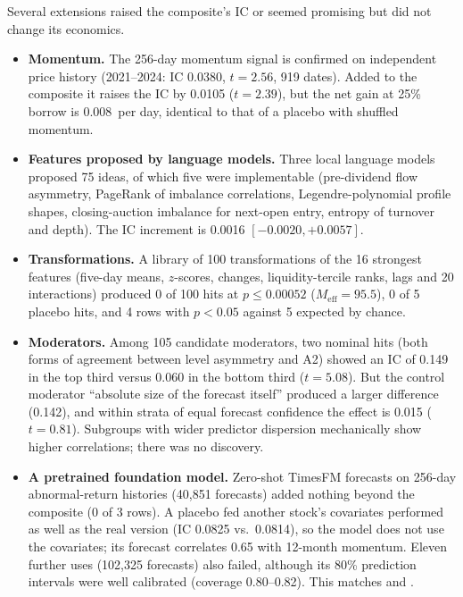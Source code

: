 Several extensions raised the composite's IC or seemed promising but did not change its economics.
\begin{itemize}
\item \textbf{Momentum.} The 256-day momentum signal is confirmed on independent price history (2021--2024: IC 0.0380, $t=2.56$, 919 dates). Added to the composite it raises the IC by 0.0105 ($t=2.39$), but the net gain at 25\% borrow is 0.008\pp\ per day, identical to that of a placebo with shuffled momentum.
\item \textbf{Features proposed by language models.} Three local language models proposed 75 ideas, of which five were implementable (pre-dividend flow asymmetry, PageRank of imbalance correlations, Legendre-polynomial profile shapes, closing-auction imbalance for next-open entry, entropy of turnover and depth). The IC increment is 0.0016 $[-0.0020,+0.0057]$.
\item \textbf{Transformations.} A library of 100 transformations of the 16 strongest features (five-day means, $z$-scores, changes, liquidity-tercile ranks, lags and 20 interactions) produced 0 of 100 hits at $p\le0.00052$ ($M_{\mathrm{eff}}=95.5$), 0 of 5 placebo hits, and 4 rows with $p<0.05$ against 5 expected by chance.
\item \textbf{Moderators.} Among 105 candidate moderators, two nominal hits (both forms of agreement between level asymmetry and A2) showed an IC of 0.149 in the top third versus 0.060 in the bottom third ($t=5.08$). But the control moderator ``absolute size of the forecast itself'' produced a larger difference (0.142), and within strata of equal forecast confidence the effect is 0.015 ($t=0.81$). Subgroups with wider predictor dispersion mechanically show higher correlations; there was no discovery.
\item \textbf{A pretrained foundation model.} Zero-shot TimesFM forecasts \citep{das2024} on 256-day abnormal-return histories (40,851 forecasts) added nothing beyond the composite (0 of 3 rows). A placebo fed another stock's covariates performed as well as the real version (IC 0.0825 vs.\ 0.0814), so the model does not use the covariates; its forecast correlates 0.65 with 12-month momentum. Eleven further uses (102,325 forecasts) also failed, although its 80\% prediction intervals were well calibrated (coverage 0.80--0.82). This matches \citet{rahimikia2025} and \citet{alonso2026}.
\end{itemize}
